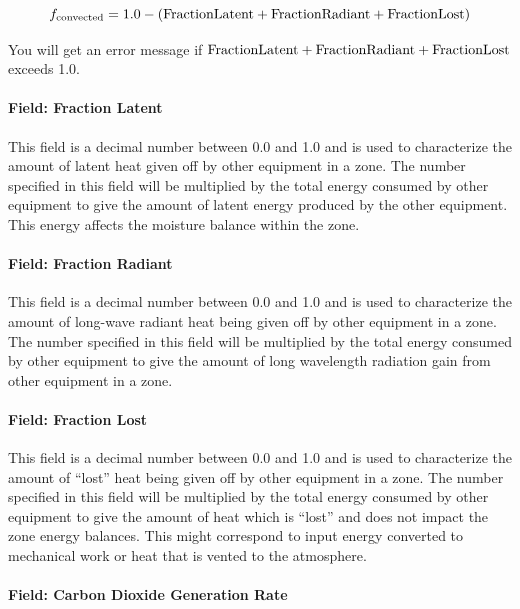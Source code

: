 \begin{equation}
  f_{\rm{convected}} = 1.0 - (\rm{Fraction Latent} + \rm{Fraction Radiant} + \rm{Fraction Lost})
\end{equation}

You will get an error message if \(\rm{Fraction Latent} + \rm{Fraction Radiant} + \rm{Fraction Lost}\) exceeds 1.0.

\paragraph{Field: Fraction Latent}\label{field-fraction-latent-4}

This field is a decimal number between 0.0 and 1.0 and is used to characterize the amount of latent heat given off by other equipment in a zone. The number specified in this field will be multiplied by the total energy consumed by other equipment to give the amount of latent energy produced by the other equipment. This energy affects the moisture balance within the zone.

\paragraph{Field: Fraction Radiant}\label{field-fraction-radiant-6}

This field is a decimal number between 0.0 and 1.0 and is used to characterize the amount of long-wave radiant heat being given off by other equipment in a zone. The number specified in this field will be multiplied by the total energy consumed by other equipment to give the amount of long wavelength radiation gain from other equipment in a zone.

\paragraph{Field: Fraction Lost}\label{field-fraction-lost-4}

This field is a decimal number between 0.0 and 1.0 and is used to characterize the amount of ``lost'' heat being given off by other equipment in a zone. The number specified in this field will be multiplied by the total energy consumed by other equipment to give the amount of heat which is ``lost'' and does not impact the zone energy balances. This might correspond to input energy converted to mechanical work or heat that is vented to the atmosphere.

\paragraph{Field: Carbon Dioxide Generation Rate}\label{field-carbon-dioxide-generation-rate-otherequip}

